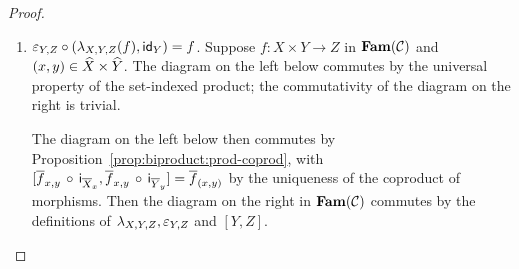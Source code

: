 \begin{proof}
\begin{enumerate}
\item $\varepsilon_{Y,Z} \circ (\lambda_{X,Y,Z}(f), \mathsf{id}_{Y}) = f$. Suppose $f: X \times Y \to Z$ in $\mathbf{Fam}(\mathcal{C})$
and $(x, y) \in \widehat{X} \times \widehat{Y}$. The diagram on the left below commutes by the universal property of
the set-indexed product; the commutativity of the diagram on the right is trivial.

\begin{center}
\hspace{1cm}
\end{center}

The diagram on the left below then commutes by Proposition~\ref{prop:biproduct:prod-coprod}, with
$[\overline{f}_{x,y}\,\circ\,\mathsf{i}_{\overline{X}_x}, \overline{f}_{x,y}\,\circ\,\mathsf{i}_{\overline{Y}_y}] =
\overline{f}_{(x,y)}$ by the uniqueness of the coproduct of morphisms. Then the diagram on the right in
$\mathbf{Fam}(\mathcal{C})$ commutes by the definitions of $\lambda_{X,Y,Z}, \varepsilon_{Y,Z}$ and $[Y,Z]$.

\begin{center}
\hspace{1cm}
\end{center}
\end{enumerate}
\end{proof}
